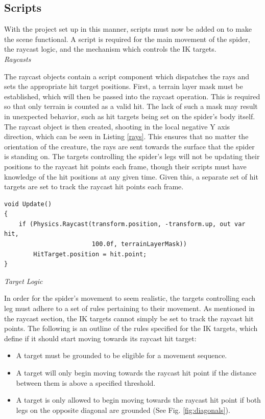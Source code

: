 \subsection{Scripts}
With the project set up in this manner, scripts must now be added on to make the
scene functional. A script is required for the main movement of the spider, the
raycast logic, and the mechanism which controls the IK targets.\\

\noindent\textit{Raycasts}

The raycast objects contain a script component which dispatches the rays and
sets the appropriate hit target positions. First, a terrain layer mask must be
established, which will then be passed into the raycast operation. This is
required so that only terrain is counted as a valid hit. The lack of such a mask
may result in unexpected behavior, such as hit targets being set on the spider's
body itself. The raycast object is then created, shooting in the local negative
Y axis direction, which can be seen in Listing \ref{rays}. This ensures that no
matter the orientation of the creature, the rays are sent towards the surface
that the spider is standing on. The targets controlling the spider's legs will
not be updating their positions to the raycast hit points each frame, though
their scripts must have knowledge of the hit positions at any given time. Given
this, a separate set of hit targets are set to track the raycast hit points each
frame.\\

\begin{lstlisting}[basicstyle=\linespread{0.9}\footnotesize\ttfamily, numbers=none,frame=single,
caption={Ray casts scanning for terrain. \textit{RayLogic.cs}},captionpos=t,
label=rays, language={[Sharp]c}, float=tp]
void Update()
{
    if (Physics.Raycast(transform.position, -transform.up, out var hit, 
                        100.0f, terrainLayerMask))
        HitTarget.position = hit.point;
}
\end{lstlisting}

\noindent\textit{Target Logic}

In order for the spider's movement to seem realistic, the targets controlling
each leg must adhere to a set of rules pertaining to their movement. As
mentioned in the raycast section, the IK targets cannot simply be set to track
the raycast hit points. The following is an outline of the rules specified for
the IK targets, which define if it should start moving towards its raycast hit
target:
\begin{itemize}
    \item A target must be grounded to be eligible for a movement sequence.

    \item A target will only begin moving towards the raycast hit point if the
        distance between them is above a specified threshold.

    \item A target is only allowed to begin moving towards the raycast hit
        point if both legs on the opposite diagonal are grounded (See Fig.
        \ref{fig:diagonals}).
\end{itemize}


